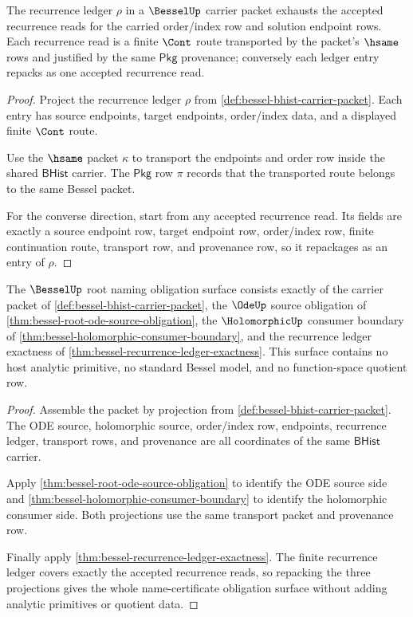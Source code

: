 \begin{theorem}
\label{thm:bessel-recurrence-ledger-exactness}
The recurrence ledger $\rho$ in a $\BesselUp$ carrier packet exhausts the
accepted recurrence reads for the carried order/index row and solution
endpoint rows. Each recurrence read is a finite $\Cont$ route transported by
the packet's $\hsame$ rows and justified by the same $\mathsf{Pkg}$
provenance; conversely each ledger entry repacks as one accepted recurrence
read.
\end{theorem}
\begin{proof}
Project the recurrence ledger $\rho$ from
\autoref{def:bessel-bhist-carrier-packet}. Each entry has source endpoints,
target endpoints, order/index data, and a displayed finite $\Cont$ route.

Use the $\hsame$ packet $\kappa$ to transport the endpoints and order row
inside the shared $\mathsf{BHist}$ carrier. The $\mathsf{Pkg}$ row $\pi$
records that the transported route belongs to the same Bessel packet.

For the converse direction, start from any accepted recurrence read. Its
fields are exactly a source endpoint row, target endpoint row, order/index
row, finite continuation route, transport row, and provenance row, so it
repackages as an entry of $\rho$.
\end{proof}

\begin{theorem}
\label{thm:bessel-namecert-obligation-surface}
The $\BesselUp$ root naming obligation surface consists exactly of the
carrier packet of \autoref{def:bessel-bhist-carrier-packet}, the $\OdeUp$
source obligation of \autoref{thm:bessel-root-ode-source-obligation}, the
$\HolomorphicUp$ consumer boundary of
\autoref{thm:bessel-holomorphic-consumer-boundary}, and the recurrence ledger
exactness of \autoref{thm:bessel-recurrence-ledger-exactness}. This surface
contains no host analytic primitive, no standard Bessel model, and no
function-space quotient row.
\end{theorem}
\begin{proof}
Assemble the packet by projection from
\autoref{def:bessel-bhist-carrier-packet}. The ODE source, holomorphic source,
order/index row, endpoints, recurrence ledger, transport rows, and provenance
are all coordinates of the same $\mathsf{BHist}$ carrier.

Apply \autoref{thm:bessel-root-ode-source-obligation} to identify the ODE
source side and \autoref{thm:bessel-holomorphic-consumer-boundary} to
identify the holomorphic consumer side. Both projections use the same
transport packet and provenance row.

Finally apply \autoref{thm:bessel-recurrence-ledger-exactness}. The finite
recurrence ledger covers exactly the accepted recurrence reads, so repacking
the three projections gives the whole name-certificate obligation surface
without adding analytic primitives or quotient data.
\end{proof}

